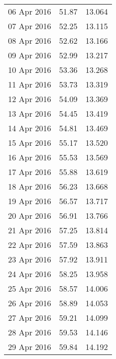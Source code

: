 \documentclass[11pt,a4paper,twoside]{article}
\begin{document}
\begin{longtable}{lcc}
06 Apr 2016                    & 51.87                & 13.064     \\
07 Apr 2016                    & 52.25                & 13.115     \\
08 Apr 2016                    & 52.62                & 13.166     \\
09 Apr 2016                    & 52.99                & 13.217     \\
10 Apr 2016                    & 53.36                & 13.268     \\
11 Apr 2016                    & 53.73                & 13.319     \\
12 Apr 2016                    & 54.09                & 13.369     \\
13 Apr 2016                    & 54.45                & 13.419     \\
14 Apr 2016                    & 54.81                & 13.469     \\
15 Apr 2016                    & 55.17                & 13.520     \\
16 Apr 2016                    & 55.53                & 13.569     \\
17 Apr 2016                    & 55.88                & 13.619     \\
18 Apr 2016                    & 56.23                & 13.668     \\
19 Apr 2016                    & 56.57                & 13.717     \\
20 Apr 2016                    & 56.91                & 13.766     \\
21 Apr 2016                    & 57.25                & 13.814     \\
22 Apr 2016                    & 57.59                & 13.863     \\
23 Apr 2016                    & 57.92                & 13.911     \\
24 Apr 2016                    & 58.25                & 13.958     \\
25 Apr 2016                    & 58.57                & 14.006     \\
26 Apr 2016                    & 58.89                & 14.053     \\
27 Apr 2016                    & 59.21                & 14.099     \\
28 Apr 2016                    & 59.53                & 14.146     \\
29 Apr 2016                    & 59.84                & 14.192     \\

\end{longtable}
\end{document}
